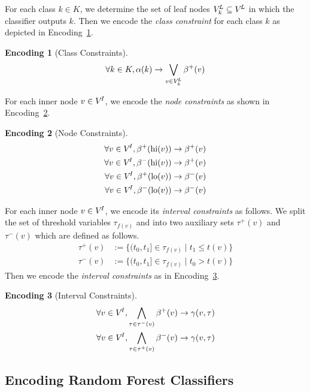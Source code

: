 \documentclass[a4paper, USenglish, cleveref, autoref, thm-restate]{lipics-v2021}
\DeclareMathOperator\hi{\ensuremath{\mathsf{hi}}}
\DeclareMathOperator\lo{\ensuremath{\mathsf{lo}}}
\theoremstyle{definition}
\newtheorem{encoding}{Encoding}[section]
\begin{document}
For each class $k \in K$, we determine the set of leaf nodes $V^{\!L}_k \subseteq V^{\!L}$ in which the classifier outputs $k$. 
Then we encode the \emph{class constraint} for each class $k$ as depicted in Encoding~\ref{enc:class}. 
%
\begin{encoding}[Class Constraints]
\label{enc:class}
\begin{align*}
\forall k \in K, \alpha(k) \rightarrow \bigvee\limits_{v \in V^{\!L}_k} \beta^+(v)
\end{align*}
\end{encoding}
%
For each inner node $v \in V^{\!I}$, we encode the \emph{node constraints} as shown in Encoding~\ref{enc:node}. 
%
\begin{encoding}[Node Constraints]
\label{enc:node}
\begin{align*}
\forall v \in \innernodes, \nodehv{\hi(v)} &\rightarrow \nodehv{v}\\ 
\forall v \in \innernodes, \nodelv{\hi(v)} &\rightarrow \nodehv{v}\\ 
\forall v \in \innernodes, \nodehv{\lo(v)} &\rightarrow \nodelv{v}\\ 
\forall v \in \innernodes, \nodelv{\lo(v)} &\rightarrow \nodelv{v}
\end{align*}
\end{encoding}
%
For each inner node $v \in V^{\!I}$, we encode its \emph{interval constraints} as follows. 
We split the set of threshold variables $\tau_{f(v)}$ and into two auxiliary sets $\tau^+(v)$ and $\tau^-(v)$ which are defined as follows. 
%
\begin{align*}
\tau^+(v) &:= \{ (t_0, t_1] \in \tau_{f(v)} \mid t_1 \leq t(v) \}\\
\tau^-(v) &:= \{ (t_0, t_1] \in \tau_{f(v)} \mid t_0 > t(v) \}
\end{align*}
%
Then we encode the \emph{interval constraints} as in Encoding~\ref{enc:inter}. 
%
\begin{encoding}[Interval Constraints]
\label{enc:inter}
\begin{align*}
\forall v \in V^{\!I}, \bigwedge\limits_{\tau \in \tau^-(v)} \beta^+(v) \rightarrow \gamma(v, \tau)\\
\forall v \in V^{\!I}, \bigwedge\limits_{\tau \in \tau^+(v)} \beta^-(v) \rightarrow \gamma(v, \tau)
\end{align*}
\end{encoding}


\subsection{Encoding Random Forest Classifiers}
\label{sec:approach:rf}
\end{document}
